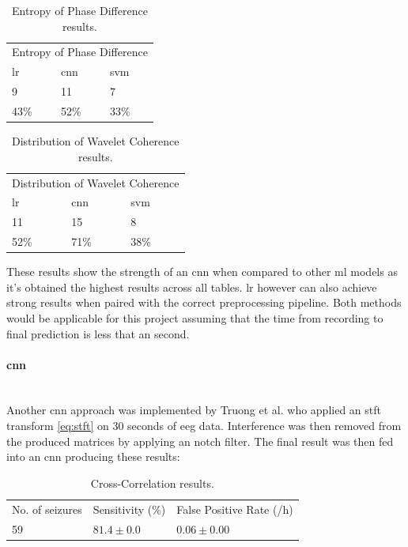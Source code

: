 \documentclass[12pt]{article}
\begin{document}
\begin{table}[H]
\centering
\begin{tabular}{lll}
\multicolumn{3}{l}{Entropy of Phase Difference} \\
\acrshort{lr}          & \acrshort{cnn}        & \acrshort{svm}        \\
9              & 11             & 7             \\
43\%           & 52\%           & 33\%         
\end{tabular}
\caption{Entropy of Phase Difference results. }
\end{table}

\begin{table}[H]
\centering
\begin{tabular}{lll}
\multicolumn{3}{l}{Distribution of Wavelet Coherence} \\
\acrshort{lr}          & \acrshort{cnn}        & \acrshort{svm}        \\
11               & 15               & 8               \\
52\%             & 71\%             & 38\%           
\end{tabular}
\caption{Distribution of Wavelet Coherence results.}
\end{table}

These results show the strength of an \acrshort{cnn} when compared to other \acrshort{ml} models as it's obtained the highest results across all tables. \acrshort{lr} however can also achieve strong results when paired with the correct preprocessing pipeline. Both methods would be applicable for this project assuming that the time from recording to final prediction is less that an second.

\paragraph{\acrfull{cnn}}\mbox{}\\

Another \acrshort{cnn} approach was implemented by Truong et al. \cite{truong2018convolutional} who applied an \acrfull{stft} transform \ref{eq:stft} on 30 seconds of \acrshort{eeg} data. Interference was then removed from the produced matrices by applying an notch filter. The final result was then fed into an \acrshort{cnn} producing these results: 

\begin{table}[H]
\centering
\begin{tabular}{lll}
No. of seizures & Sensitivity (\%) & False Positive Rate (/h) \\
59              & $81.4 \pm 0.0$   & $0.06 \pm 0.00$         
\end{tabular}
\caption{Cross-Correlation results. }
\label{tab:my-table}
\end{table}
\end{document}
